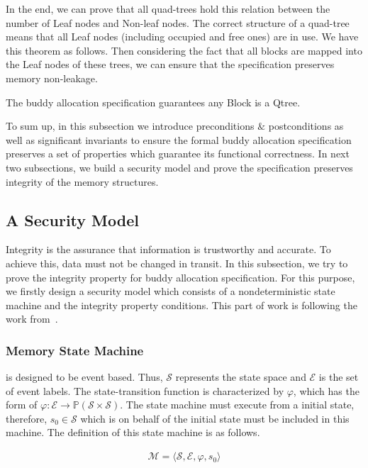 In the end, we can prove that all quad-trees hold this relation between the number of Leaf nodes and Non-leaf nodes. The correct structure of a quad-tree means that all Leaf nodes (including occupied and free ones) are in use. We have this theorem as follows. Then considering the fact that all blocks are mapped into the Leaf nodes of these trees, we can ensure that the specification preserves memory non-leakage.

\begin{theorem}
The buddy allocation specification guarantees any Block is a Qtree.
\end{theorem}

To sum up, in this subsection we introduce preconditions $\&$ postconditions as well as significant invariants to ensure the formal buddy allocation specification preserves a set of properties which guarantee its functional correctness. In next two subsections, we build a security model and prove the specification preserves integrity of the memory structures.

\subsection{A Security Model}\label{sec:securitymodel}
Integrity is the assurance that information is trustworthy and accurate. To achieve this, data must not be changed in transit. In this subsection, we try to prove the integrity property for buddy allocation specification. For this purpose, we firstly design a security model which consists of a nondeterministic state machine and the integrity property conditions. This part of work is following the work from~\cite{reg_securitymodel}.

\subsubsection{Memory State Machine} is designed to be event based. Thus, $\mathcal{S}$ represents the state space and $\mathcal{E}$ is the set of event labels. The state-transition function is characterized by $\varphi$, which has the form of $\varphi: \mathcal{E} \rightarrow \mathbb{P}(\mathcal{S} \times \mathcal{S})$. The state machine must execute from a initial state, therefore, $s_0 \in \mathcal{S}$ which is on behalf of the initial state must be included in this machine. The definition of this state machine is as follows.

\begin{definition} 
\vspace{-7pt}
\end{definition}	
{\footnotesize
\begin{align*}
\mathcal{M} = \langle \mathcal{S}, \mathcal{E}, \varphi, s_0 \rangle
\end{align*}
}
\vspace{-12pt}

